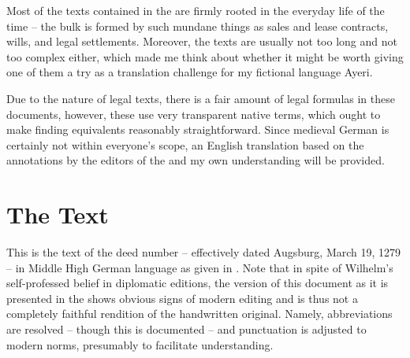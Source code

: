 \documentclass[12pt,paper=a4]{scrartcl}
\begin{document}
Most of the texts contained in the  are firmly rooted in the everyday life of the time – the bulk is formed by such mundane things as sales and lease contracts, wills, and legal settlements. Moreover, the texts are usually not too long and not too complex either, which made me think about whether it might be worth giving one of them a try as a translation challenge for my fictional language Ayeri.

Due to the nature of legal texts, there is a fair amount of legal formulas in these documents, however, these use very transparent native terms, which ought to make finding equivalents reasonably straightforward. Since medieval German is certainly not within everyone's scope, an English translation based on the annotations by the editors of the  and my own understanding will be provided.

\section{The Text}
This is the text of the deed number  -- effectively dated Augsburg, March 19, 1279 -- in Middle High German language as given in \textcite{n163}. Note that in spite of Wilhelm's self-professed belief in diplomatic editions, the version of this document as it is presented in the  shows obvious signs of modern editing and is thus not a completely faithful rendition of the handwritten original. Namely, abbreviations are resolved – though this is documented – and punctuation is adjusted to modern norms, presumably to facilitate understanding.
\end{document}
